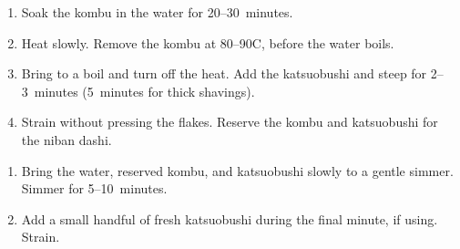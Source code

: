 \label{dashi2}


\begin{ingredients}
\end{ingredients}


\begin{recipe}
  \begin{enumerate}

  \item Soak the kombu in the water for 20--30~minutes.

  \item Heat slowly.  Remove the kombu at 80--90\textdegree C, before
    the water boils.

  \item Bring to a boil and turn off the heat.  Add the katsuobushi
    and steep for 2--3~minutes (5~minutes for thick shavings).

  \item Strain without pressing the flakes.  Reserve the kombu and
    katsuobushi for the niban dashi.

  \end{enumerate}
\end{recipe}



\begin{ingredients}
\end{ingredients}


\begin{recipe}
  \begin{enumerate}

  \item Bring the water, reserved kombu, and katsuobushi slowly to a
    gentle simmer.  Simmer for 5--10~minutes.

  \item Add a small handful of fresh katsuobushi during the final
    minute, if using.  Strain.

  \end{enumerate}
\end{recipe}

